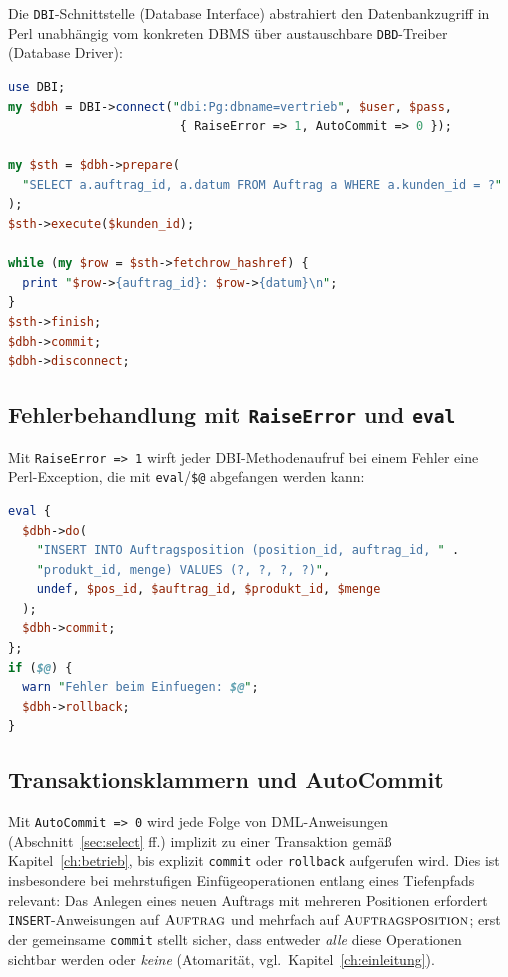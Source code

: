 ﻿\documentclass[a4paper,12pt]{report}
\theoremstyle{definition}
\theoremstyle{remark}
\begin{document}
Die \texttt{DBI}-Schnittstelle (Database Interface) abstrahiert den
Datenbankzugriff in Perl unabhängig vom konkreten DBMS über
austauschbare \texttt{DBD}-Treiber (Database Driver):

\begin{lstlisting}[language=Perl]
use DBI;
my $dbh = DBI->connect("dbi:Pg:dbname=vertrieb", $user, $pass,
                        { RaiseError => 1, AutoCommit => 0 });

my $sth = $dbh->prepare(
  "SELECT a.auftrag_id, a.datum FROM Auftrag a WHERE a.kunden_id = ?"
);
$sth->execute($kunden_id);

while (my $row = $sth->fetchrow_hashref) {
  print "$row->{auftrag_id}: $row->{datum}\n";
}
$sth->finish;
$dbh->commit;
$dbh->disconnect;
\end{lstlisting}

\subsection{Fehlerbehandlung mit \texttt{RaiseError} und \texttt{eval}}

Mit \texttt{RaiseError => 1} wirft jeder DBI-Methodenaufruf bei einem
Fehler eine Perl-Exception, die mit \texttt{eval}/\texttt{\$@}
abgefangen werden kann:

\begin{lstlisting}[language=Perl]
eval {
  $dbh->do(
    "INSERT INTO Auftragsposition (position_id, auftrag_id, " .
    "produkt_id, menge) VALUES (?, ?, ?, ?)",
    undef, $pos_id, $auftrag_id, $produkt_id, $menge
  );
  $dbh->commit;
};
if ($@) {
  warn "Fehler beim Einfuegen: $@";
  $dbh->rollback;
}
\end{lstlisting}

\subsection{Transaktionsklammern und AutoCommit}

Mit \texttt{AutoCommit => 0} wird jede Folge von DML-Anweisungen
(Abschnitt~\ref{sec:select} ff.) implizit zu einer Transaktion gemäß
Kapitel~\ref{ch:betrieb}, bis explizit \texttt{commit} oder
\texttt{rollback} aufgerufen wird. Dies ist insbesondere bei
mehrstufigen Einfügeoperationen entlang eines Tiefenpfads relevant: Das
Anlegen eines neuen Auftrags mit mehreren Positionen erfordert
\texttt{INSERT}-Anweisungen auf $\textsc{Auftrag}$ und mehrfach auf
$\textsc{Auftragsposition}$; erst der gemeinsame
\texttt{commit} stellt sicher, dass entweder \emph{alle} diese
Operationen sichtbar werden oder \emph{keine} (Atomarität, vgl.\
Kapitel~\ref{ch:einleitung}).
\end{document}

